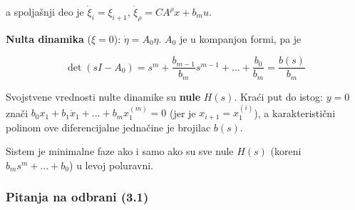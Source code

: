\documentclass[11pt,a4paper,parskip=half,headsepline,numbers=noenddot]{scrartcl}
\begin{document}
a spoljašnji deo je \(\dot\xi_i = \xi_{i+1}\), \(\dot\xi_\rho = CA^\rho x + b_mu\).

\textbf{Nulta dinamika} (\(\xi = 0\)): \(\dot\eta = A_0\eta\). \(A_0\) je u kompanjon formi, pa je

\[\det(sI - A_0) = s^m + \frac{b_{m-1}}{b_m}s^{m-1} + \dots + \frac{b_0}{b_m} = \frac{b(s)}{b_m}\]

Svojstvene vrednosti nulte dinamike su \textbf{nule} \(H(s)\). Kraći put do istog: \(y = 0\) znači \(b_0x_1 + b_1\dot x_1 + \dots + b_mx_1^{(m)} = 0\) (jer je \(x_{i+1} = x_1^{(i)}\)), a karakteristični polinom ove diferencijalne jednačine je brojilac \(b(s)\).

\begin{kljucna}
Sistem je minimalne faze ako i samo ako su sve nule \(H(s)\) (koreni \(b_ms^m + \dots + b_0\)) u levoj poluravni.
\end{kljucna}

\subsubsection{Pitanja na odbrani (3.1)}
\end{document}
